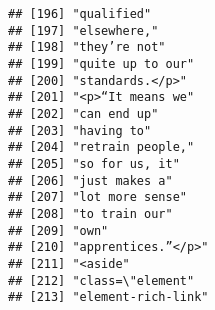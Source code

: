 \documentclass[]{article}
\begin{document}
\begin{verbatim}
## [196] "qualified"                                                                                                                                
## [197] "elsewhere,"                                                                                                                               
## [198] "they’re not"                                                                                                                              
## [199] "quite up to our"                                                                                                                          
## [200] "standards.</p>"                                                                                                                           
## [201] "<p>“It means we"                                                                                                                          
## [202] "can end up"                                                                                                                               
## [203] "having to"                                                                                                                                
## [204] "retrain people,"                                                                                                                          
## [205] "so for us, it"                                                                                                                            
## [206] "just makes a"                                                                                                                             
## [207] "lot more sense"                                                                                                                           
## [208] "to train our"                                                                                                                             
## [209] "own"                                                                                                                                      
## [210] "apprentices.”</p>"                                                                                                                        
## [211] "<aside"                                                                                                                                   
## [212] "class=\"element"                                                                                                                          
## [213] "element-rich-link"                                                                                                                        

\end{verbatim}
\end{document}
